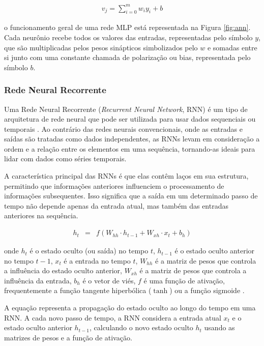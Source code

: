  \begin{eqnarray}
 	v_j=\sum_{i=0}^m w_i y_i+b\label{eq:ann}
 \end{eqnarray}
 
 \noindent o funcionamento geral de uma rede MLP está representada na Figura \ref{fig:ann}. Cada neurônio recebe todos os valores das entradas, representadas pelo símbolo $y$, que são multiplicadas pelos pesos sinápticos simbolizados pelo $w$ e somadas entre si junto com uma constante chamada de polarização ou bias, representada pelo símbolo $b$.
 
  \subsubsection{Rede Neural Recorrente}
  
 Uma Rede Neural Recorrente (\textit{Recurrent Neural Network}, RNN) é um tipo de arquitetura de rede neural que pode ser utilizada para usar dados sequenciais ou temporais \cite{NASIRI2023110867}. Ao contrário das redes neurais convencionais, onde as entradas e saídas são tratadas como dados independentes, as RNNs levam em consideração a ordem e a relação entre os elementos em uma sequência, tornando-as ideais para lidar com dados como séries temporais.
 
 A característica principal das RNNs é que elas contêm laços em sua estrutura, permitindo que informações anteriores influenciem o processamento de informações subsequentes. Isso significa que a saída em um determinado passo de tempo não depende apenas da entrada atual, mas também das entradas anteriores na sequência.
  
 \begin{eqnarray}
 	h_t &=& f(W_{hh} \cdot h_{t-1} + W_{xh} \cdot x_t + b_h)\label{eq:rnn}
 \end{eqnarray}
 
 \noindent onde \( h_t \) é o estado oculto (ou saída) no tempo \( t \), \( h_{t-1} \) é o estado oculto anterior no tempo \( t-1 \), \( x_t \) é a entrada no tempo \( t \), \( W_{hh} \) é a matriz de pesos que controla a influência do estado oculto anterior, \( W_{xh} \) é a matriz de pesos que controla a influência da entrada, \( b_h \) é o vetor de viés, \( f \) é uma função de ativação, frequentemente a função tangente hiperbólica ($\operatorname{tanh}$) ou a função sigmoide \cite{lstm}.
 
 A equação representa a propagação do estado oculto ao longo do tempo em uma RNN. A cada novo passo de tempo, a RNN considera a entrada atual \( x_t \) e o estado oculto anterior \( h_{t-1} \), calculando o novo estado oculto \( h_t \) usando as matrizes de pesos e a função de ativação. 
 
